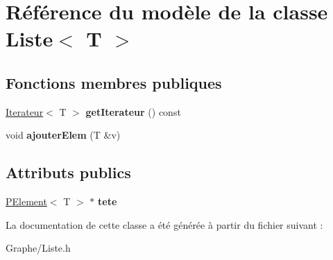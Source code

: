 \hypertarget{class_liste}{}\section{Référence du modèle de la classe Liste$<$ T $>$}
\label{class_liste}
\subsection*{Fonctions membres publiques}
\begin{DoxyCompactItemize}
\item 
\mbox{\label{class_liste_a83c5eb9c99b1af1e7efc55220d6a5ad0}} 
\mbox{\hyperlink{class_iterateur}{Iterateur}}$<$ T $>$ {\bfseries get\+Iterateur} () const
\item 
\mbox{\label{class_liste_a73c875e2991ed16bd7708d8ba153ac5c}} 
void {\bfseries ajouter\+Elem} (T \&v)
\end{DoxyCompactItemize}
\subsection*{Attributs publics}
\begin{DoxyCompactItemize}
\item 
\mbox{\label{class_liste_a8a4bfa190def228ed3408490dbf8bca8}} 
\mbox{\hyperlink{class_p_element}{P\+Element}}$<$ T $>$ $\ast$ {\bfseries tete}
\end{DoxyCompactItemize}


La documentation de cette classe a été générée à partir du fichier suivant \+:\begin{DoxyCompactItemize}
\item 
Graphe/Liste.\+h\end{DoxyCompactItemize}
